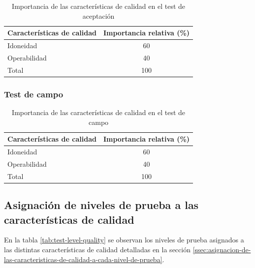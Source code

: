 \documentclass[
11pt, %
codirector, %
]{simple_charter}
\begin{document}
\begin{table}[H]
\centering
\begin{tabular}{@{}lc@{}}
\toprule
\textbf{Características de calidad} & \textbf{Importancia relativa (\%)} \\ \midrule
Idoneidad                           & 60                                 \\
Operabilidad                        & 40                                 \\
Total                               & 100                                \\ \bottomrule
\end{tabular}
\caption{Importancia de las características de calidad en el test de aceptación}
\label{tab:ir-test-accept}
\end{table}

\subsubsection{Test de campo}
\label{sssec:test-de-campo}

\begin{table}[H]
\centering
\begin{tabular}{@{}lc@{}}
\toprule
\textbf{Características de calidad} & \textbf{Importancia relativa (\%)} \\ \midrule
Idoneidad                           & 60                                 \\
Operabilidad                        & 40                                 \\
Total                               & 100                                \\ \bottomrule
\end{tabular}
\caption{Importancia de las características de calidad en el test de campo}
\label{tab:ir-test-field}
\end{table}

\subsection{Asignación de niveles de prueba a las características de calidad}
\label{ssec:asignacion-de-niveles-de-prueba-a-las-caracteristicas-de-calidad}

En la tabla \ref{tab:test-level-quality} se observan los niveles de prueba asignados a las distintas
características de calidad detalladas en la sección
\ref{ssec:asignacion-de-las-caracteristicas-de-calidad-a-cada-nivel-de-prueba}.
\end{document}
